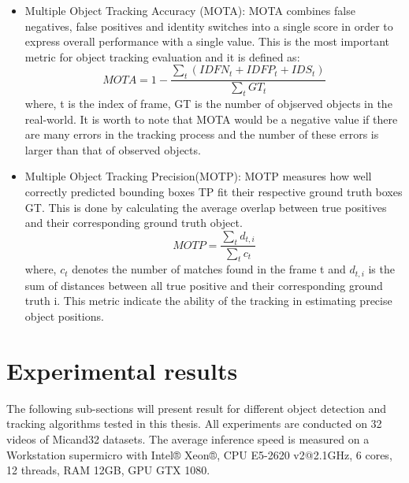 \begin{itemize}
	\item Multiple Object Tracking Accuracy (MOTA): MOTA combines false negatives, false positives and identity switches into a single score in order to express overall performance with a single value. This is the most important metric for object tracking evaluation and it is defined as:
	\begin{equation}
		MOTA = 1 - \frac{\sum _t (IDFN_t+IDFP_t+IDS_t)}{\sum _t GT_t}
	\end{equation}
where, t is the index of frame, GT is the number of objserved objects in the real-world. It is worth to note that MOTA would be a negative value if there are many errors in the tracking process and the number of these errors is larger than that of observed objects.
	\item Multiple Object Tracking Precision(MOTP): MOTP measures how well correctly predicted bounding boxes TP fit their respective ground truth boxes GT. This is done by calculating the average overlap between true positives and their corresponding ground truth object.
	\begin{equation}
		MOTP = \frac{\sum _t d_{t,i}}{\sum _t c_t}
	\end{equation}
where, \(c_t\) denotes the number of matches found in the frame t and \(d_{t,i}\) is the sum of distances between all true positive and their corresponding ground truth i. This metric indicate the ability of the tracking in estimating precise object positions.
\end{itemize}
\section{Experimental results}
The following sub-sections will present result for different object detection and tracking algorithms tested in this thesis. All experiments are conducted on 32 videos of Micand32 datasets. The average inference speed is measured on a Workstation supermicro with Intel® Xeon®, CPU E5-2620 v2@2.1GHz, 6 cores, 12 threads, RAM 12GB, GPU GTX 1080.
